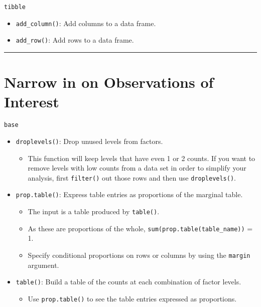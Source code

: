 \documentclass[]{book}
\providecommand{\tightlist}{%
  \setlength{\itemsep}{0pt}\setlength{\parskip}{0pt}}
\theoremstyle{definition}
\theoremstyle{definition}
\theoremstyle{definition}
\theoremstyle{remark}
\begin{document}
\texttt{tibble}

\begin{itemize}
\tightlist
\item
  \texttt{add\_column()}: Add columns to a data frame.
\item
  \texttt{add\_row()}: Add rows to a data frame.
\end{itemize}

\begin{center}\rule{0.5\linewidth}{\linethickness}\end{center}

\section{Narrow in on Observations of
Interest}\label{narrow-in-on-observations-of-interest}

\texttt{base}

\begin{itemize}
\tightlist
\item
  \texttt{droplevels()}: Drop unused levels from factors.

  \begin{itemize}
  \tightlist
  \item
    This function will keep levels that have even 1 or 2 counts. If you
    want to remove levels with low counts from a data set in order to
    simplify your analysis, first \texttt{filter()} out those rows and
    then use \texttt{droplevels()}.
  \end{itemize}
\item
  \texttt{prop.table()}: Express table entries as proportions of the
  marginal table.

  \begin{itemize}
  \tightlist
  \item
    The input is a table produced by \texttt{table()}.
  \item
    As these are proportions of the whole,
    \texttt{sum(prop.table(table\_name))} = 1.
  \item
    Specify conditional proportions on rows or columns by using the
    \texttt{margin} argument.
  \end{itemize}
\item
  \texttt{table()}: Build a table of the counts at each combination of
  factor levels.

  \begin{itemize}
  \tightlist
  \item
    Use \texttt{prop.table()} to see the table entries expressed as
    proportions.
  \end{itemize}
\end{itemize}
\end{document}
